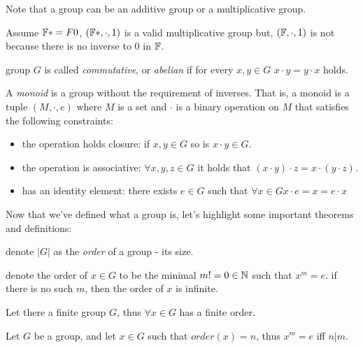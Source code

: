 \begin{remark}
    Note that a group can be an additive group or a multiplicative group.
\end{remark}
\begin{example}
    Assume $\mathbb{F}*=F\\{0}$, $(\mathbb{F}*, \cdot, 1)$ is a valid multiplicative group but,
    $(\mathbb{F}, \cdot, 1)$ is not because there is no inverse to $0$ in $\mathbb{F}$.
\end{example}

\begin{defn}
    group $G$ is called \emph{commutative}, or \emph{abelian} if for every $x,y\in G$ $x\cdot y=y\cdot x$ holds.
\end{defn}


\begin{defn}
    A \emph{monoid} is a group without the requirement of inverses.
    That is, a monoid is a tuple $(M,\cdot,e)$ where $M$ is a set and $\cdot$ is a binary operation on $M$
    that satisfies the following constraints:

    \begin{itemize}
    \item the operation holds closure: if $x,y\in G$ so is $x\cdot y\in G$.
    \item the operation is associative: $\forall x,y,z\in G$ it holds that $(x\cdot y)\cdot z = x\cdot (y\cdot z)$.
    \item has an identity element: there exists $e\in G$ such that $\forall x\in G x\cdot e = x = e\cdot x$
    \end{itemize}
\end{defn}


Now that we've defined what a group is, let's highlight some important theorems and definitions:

\begin{defn}
    denote $|G|$ as the \emph{order} of a group - its size.
\end{defn}

\begin{defn}
    denote the order of $x\in G$ to be the minimal $m!=0\in\mathbb{N}$ such that  $x^m=e$. if there is no such $m$, then
    the order of $x$ is infinite.
\end{defn}

\begin{thm}
    Let there a finite group $G$, thus $\forall x\in G$ has a finite order.
\end{thm}

\begin{thm}
    Let $G$ be a group, and let $x\in G$ such that $order(x)=n$, thus $x^m=e$ iff $n|m$.
\end{thm}

